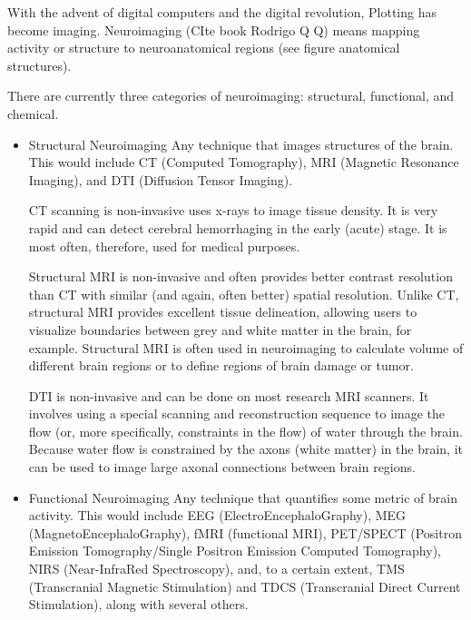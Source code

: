 \begin{story}[Neuroimaging]
With the advent of digital computers and the digital revolution, Plotting has become imaging.  Neuroimaging (CIte book Rodrigo Q Q) means mapping activity or structure to neuroanatomical regions (see figure anatomical structures).

There are currently three categories of neuroimaging: structural, functional, and chemical. 

\begin{itemize}
\item Structural Neuroimaging
Any technique that images structures of the brain. This would include CT (Computed Tomography), MRI (Magnetic Resonance Imaging), and DTI (Diffusion Tensor Imaging).

CT scanning is non-invasive uses x-rays to image tissue density. It is very rapid and can detect cerebral hemorrhaging in the early (acute) stage. It is most often, therefore, used for medical purposes.

Structural MRI is non-invasive and often provides better contrast resolution than CT with similar (and again, often better) spatial resolution. Unlike CT, structural MRI provides excellent tissue delineation, allowing users to visualize boundaries between grey and white matter in the brain, for example. Structural MRI is often used in neuroimaging to calculate volume of different brain regions or to define regions of brain damage or tumor.

DTI is non-invasive and can be done on most research MRI scanners. It involves using a special scanning and reconstruction sequence to image the flow (or, more specifically, constraints in the flow) of water through the brain. Because water flow is constrained by the axons (white matter) in the brain, it can be used to image large axonal connections between brain regions.

\item Functional Neuroimaging
Any technique that quantifies some metric of brain activity. This would include EEG (ElectroEncephaloGraphy), MEG (MagnetoEncephaloGraphy), fMRI (functional MRI), PET/SPECT (Positron Emission Tomography/Single Positron Emission Computed Tomography), NIRS (Near-InfraRed Spectroscopy), and, to a certain extent, TMS (Transcranial Magnetic Stimulation) and TDCS (Transcranial Direct Current Stimulation), along with several others.
\end{itemize}

\end{story}

